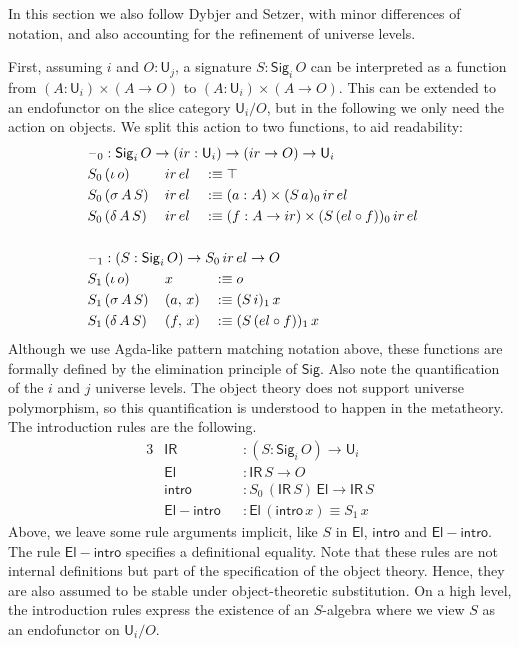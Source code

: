 \documentclass[acmsmall,screen,review,anonymous]{acmart}
\newcommand{\msf}[1]{{\mathsf{#1}}}
\newcommand{\U}{\msf{U}}
\newcommand{\El}{\msf{El}}
\newcommand{\Sig}{\msf{Sig}}
\newcommand{\blank}{{\mathord{\hspace{1pt}\text{--}\hspace{1pt}}}}
\newcommand{\ir}{{ir}}
\newcommand{\el}{{el}}
\newcommand{\IR}{\msf{IR}}
\newcommand{\intro}{\msf{intro}}
\begin{document}
In this section we also follow Dybjer and Setzer, with minor differences of notation, and also
accounting for the refinement of universe levels.

First, assuming $i$ and $O : \U_j$, a signature $S : \Sig_i\,O$ can be interpreted as a function
from $(A : \U_i) \times (A \to O)$ to $(A : \U_i) \times (A \to O)$. This can be extended to an
endofunctor on the slice category $\U_i/O$, but in the following we only need the action on
objects. We split this action to two functions, to aid readability:
\begin{alignat*}{3}
  &\rlap{$\blank_0 : \Sig_i\,O \to (\ir : \U_i) \to (\ir \to O) \to \U_i$} \\
  &S_0\,(\iota\,o)    \,&&\ir\,\el && \hspace{-0.7em}:\equiv \top\\
  &S_0\,(\sigma\,A\,S)\,&&\ir\,\el && \hspace{-0.7em}:\equiv (a : A) \times (S\,a)_0\,\ir\,\el\\
  &S_0\,(\delta\,A\,S)\,&&\ir\,\el && \hspace{-0.7em}:\equiv (f : A \to \ir) \times (S\,(\el \circ f))_0\,\ir\,\el\\
  & && &&\\
  &\rlap{$\blank_1 : (S : \Sig_i\,O) \to S_0\,\ir\,\el \to O$} \\
  &S_1\,(\iota\,o)    \,&&x       && :\equiv o\\
  &S_1\,(\sigma\,A\,S)\,&&(a,\,x) && :\equiv (S\,i)_1\,x\\
  &S_1\,(\delta\,A\,S)\,&&(f,\,x) && :\equiv (S\,(\el \circ f))_1\,x
\end{alignat*}
Although we use Agda-like pattern matching notation above, these functions are formally defined by
the elimination principle of $\Sig$. Also note the quantification of the $i$ and $j$ universe
levels. The object theory does not support universe polymorphism, so this quantification is
understood to happen in the metatheory. The introduction rules are the following.
\begin{alignat*}{3}
  &\IR                && : (S : \Sig_i\,O) \to \U_i\\
  &\El                && : \IR\,S \to O\\
  &\intro             && : S_0\,(\IR\,S)\,\El \to \IR\,S\\
  &\msf{El\!\!-\!\!intro} && : \El\,(\intro\,x) \equiv S_1\,x
\end{alignat*}
Above, we leave some rule arguments implicit, like $S$ in $\El$, $\intro$ and
$\msf{El\!\!-\!\!intro}$. The rule $\msf{El\!\!-\!\!intro}$ specifies a definitional equality.  Note
that these rules are not internal definitions but part of the specification of the object
theory. Hence, they are also assumed to be stable under object-theoretic substitution. On a high
level, the introduction rules express the existence of an $S$-algebra where we view $S$ as an
endofunctor on $\U_i/O$.
\end{document}

